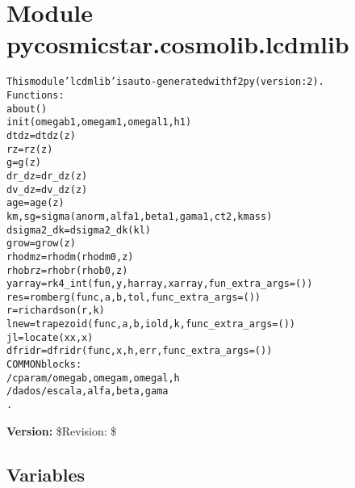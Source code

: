 %
%
%


\section{Module pycosmicstar.cosmolib.lcdmlib}

    \label{pycosmicstar:cosmolib:lcdmlib}
\begin{alltt}
This module 'lcdmlib' is auto-generated with f2py (version:2).
Functions:
  about()
  init(omegab1,omegam1,omegal1,h1)
  dtdz = dtdz(z)
  rz = rz(z)
  g = g(z)
  dr\_dz = dr\_dz(z)
  dv\_dz = dv\_dz(z)
  age = age(z)
  km,sg = sigma(anorm,alfa1,beta1,gama1,ct2,kmass)
  dsigma2\_dk = dsigma2\_dk(kl)
  grow = grow(z)
  rhodmz = rhodm(rhodm0,z)
  rhobrz = rhobr(rhob0,z)
  yarray = rk4\_int(fun,y,harray,xarray,fun\_extra\_args=())
  res = romberg(func,a,b,tol,func\_extra\_args=())
  r = richardson(r,k)
  lnew = trapezoid(func,a,b,iold,k,func\_extra\_args=())
  jl = locate(xx,x)
  dfridr = dfridr(func,x,h,err,func\_extra\_args=())
COMMON blocks:
  /cparam/ omegab,omegam,omegal,h
  /dados/ escala,alfa,beta,gama
.
\end{alltt}

\textbf{Version:} \$Revision: \$





  \subsection{Variables}

